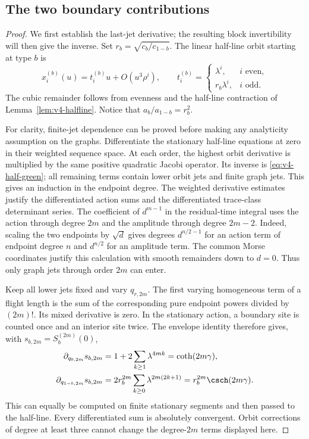 \subsection{The two boundary contributions}
\begin{proof}
We first establish the last-jet derivative; the resulting block
invertibility will then give the inverse. Set
$r_b=\sqrt{c_b/c_{1-b}}$. The linear half-line orbit starting at type
$b$ is
\begin{equation}\label{eq:v12-linear-orbit}
 x_i^{(b)}(u)=t_i^{(b)}u+O(u^3\rho^i),\qquad
 t_i^{(b)}=
 \begin{cases}\lambda^i,&i\text{ even},\\
                r_b\lambda^i,&i\text{ odd}.
 \end{cases}
\end{equation}
The cubic remainder follows from evenness and the half-line contraction
of Lemma~\ref{lem:v4-halfline}. Notice that
$a_b/a_{1-b}=r_b^2$.

For clarity, finite-jet dependence can be proved before making any
analyticity assumption on the graphs. Differentiate the stationary
half-line equations at zero in their weighted sequence space. At each
order, the highest orbit derivative is multiplied by the same positive
quadratic Jacobi operator. Its inverse is
\eqref{eq:v4-half-green}; all remaining terms contain lower orbit
jets and finite graph jets. This gives an induction in the endpoint
degree. The weighted derivative estimates justify the differentiated
action sums and the differentiated trace-class determinant series.
The coefficient of $d^{m-1}$ in the residual-time integral uses the
action through degree $2m$ and the amplitude through degree $2m-2$.
Indeed, scaling the two endpoints by $\sqrt d$ gives degrees
$d^{n/2-1}$ for an action term of endpoint degree $n$ and $d^{n/2}$
for an amplitude term. The common Morse coordinates justify this
calculation with smooth remainders down to $d=0$. Thus only graph
jets through order $2m$ can enter.

Keep all lower jets fixed and vary $q_{r,2m}$. The first varying
homogeneous term of a flight length is the sum of the corresponding
pure endpoint powers divided by $(2m)!$. Its mixed derivative is
zero. In the stationary action, a boundary site is counted once and
an interior site twice. The envelope identity therefore gives, with
$s_{b,2m}=S_b^{(2m)}(0)$,
\begin{align}
 \partial_{q_{b,2m}}s_{b,2m}
 &=1+2\sum_{k\ge1}\lambda^{4mk}=\coth(2m\gamma),\notag\\
 \partial_{q_{1-b,2m}}s_{b,2m}
 &=2r_b^{2m}\sum_{k\ge0}\lambda^{2m(2k+1)}
                   =r_b^{2m}\csch(2m\gamma).
                                      \label{eq:v12-action-block}
\end{align}
This can equally be computed on finite stationary segments and then
passed to the half-line. Every differentiated sum is absolutely
convergent. Orbit corrections of degree at least three cannot change
the degree-$2m$ terms displayed here.


\end{proof}
